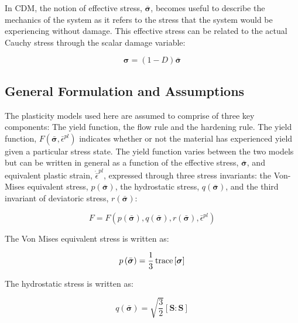 In CDM, the notion of effective stress, $\bar{\boldsymbol{\sigma}}$, becomes useful to describe the mechanics of the system as it refers to the stress that the system would be experiencing without damage. This effective stress can be related to the actual Cauchy stress through the scalar damage variable: 

\begin{equation}
\boldsymbol{\sigma}=\left(1-D\right)\bar{\boldsymbol{\sigma}}
\label{eqn:const7}
\end{equation}

\subsection{General Formulation and Assumptions}

The plasticity models used here are assumed to comprise of three key components: The yield function, the flow rule and the hardening rule. The yield function, $F\left(\bar{\boldsymbol{\sigma}},\bar{\epsilon}^{pl}\right)$ indicates whether or not the material has experienced yield given a particular stress state. The yield function varies between the two models but can be written in general as a function of the effective stress, $\bar{\boldsymbol{\sigma}}$, and equivalent plastic strain, $\dot{\bar{\epsilon}}^{pl}$, expressed through three stress invariants: the Von-Mises equivalent stress, $p\left(\bar{\boldsymbol{\sigma}}\right)$, the hydrostatic stress, $q\left(\bar{\boldsymbol{\sigma}}\right)$, and the third invariant of deviatoric stress, $r\left(\bar{\boldsymbol{\sigma}}\right)$:

\begin{equation}
    F = F\left(p\left(\bar{\boldsymbol{\sigma}}\right), q\left(\bar{\boldsymbol{\sigma}}\right), r\left(\bar{\boldsymbol{\sigma}}\right),\bar{\epsilon}^{pl}\right)
\label{eqn:gen1}
\end{equation}

The Von Mises equivalent stress is written as:

\begin{equation}
p\left(\bar{\boldsymbol{\sigma}}\right) = \frac{1}{3}\operatorname{trace}\left[\boldsymbol{\sigma}\right]
\label{eqn:gen2}
\end{equation}

The hydrostatic stress is written as:

\begin{equation}
q\left(\bar{\boldsymbol{\sigma}}\right)=\sqrt{\frac{3}{2}}\left[\mathbf{S}:\mathbf{S}\right]
\label{eqn:gen3}
\end{equation}

